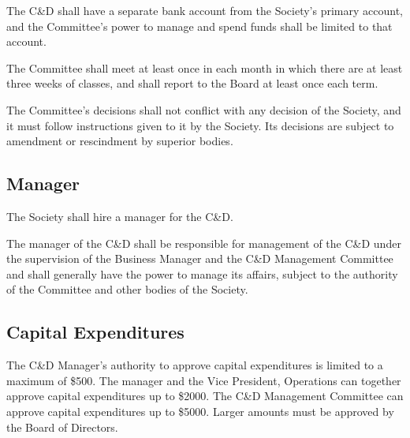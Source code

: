 The C\&D shall have a separate bank account from the Society's primary account,
and the Committee's power to manage and spend funds shall be limited to that
account.

The Committee shall meet at least once in each month in which there are at
least three weeks of classes, and shall report to the Board at least once each
term.

The Committee's decisions shall not conflict with any decision of the Society,
and it must follow instructions given to it by the Society. Its decisions are
subject to amendment or rescindment by superior bodies.

\subsection{Manager}
The Society shall hire a manager for the C\&D.

The manager of the C\&D shall be responsible for management of the C\&D under
the supervision of the Business Manager and the C\&D Management Committee and
shall generally have the power to manage its affairs, subject to the authority
of the Committee and other bodies of the Society.

\subsection{Capital Expenditures}
The C\&D Manager's authority to approve capital expenditures is limited to
a maximum of \$500. The manager and the Vice President, Operations can together
approve capital expenditures up to \$2000. The C\&D Management Committee can
approve capital expenditures up to \$5000. Larger amounts must be approved by
the Board of Directors.

